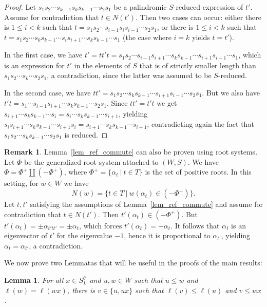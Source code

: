\documentclass[11pt]{article}
\newtheorem{lemma}[theo]{Lemma}
\theoremstyle{definition}
\newtheorem{rema}[theo]{Remark}
\numberwithin{equation}{section}
\begin{document}
\begin{proof}
	Let $s_1 s_2 \cdots s_{k-1} s_k s_{k-1}\cdots s_2 s_1$ be a palindromic $S$-reduced expression of $t'$. Assume for contradiction that $t\in N(t')$. Then two cases can occur: either there is $1\leq i < k$ such that $t=s_1 s_2 \cdots s_{i-1} s_i s_{i-1}\cdots s_2 s_1$, or there is $1 \leq i < k$ such that $t= s_1 s_2 \cdots s_k s_{k-1} \cdots s_i s_{i+1} \cdots s_k s_{k-1} \cdots s_1$ (the case where $i=k$ yields $t=t'$).
	
	In the first case, we have $t'=tt't= s_1 s_2 \cdots s_{i-1} s_{i+1} \cdots s_k s_{k-1} \cdots s_{i+1} s_{i-1} \cdots s_1$, which is an expression for $t'$ in the elements of $S$ that is of strictly smaller length than $s_1 s_2\cdots s_k \cdots s_2 s_1$, a contradiction, since the latter was assumed to be $S$-reduced. 
	
	In the second case, we have $tt'= s_1 s_2 \cdots s_k s_{k-1} \cdots s_{i+1} s_{i-1} \cdots s_2 s_1$. But we also have $t't= s_1 \cdots s_{i-1} s_{i+1}\cdots s_k s_{k-1} \cdots s_2 s_1$. Since $tt'=t't$ we get $s_{i+1} \cdots s_k s_{k-1} \cdots s_i = s_i \cdots s_k s_{k-1}\cdots s_{i+1}$, yielding $s_{i} s_{i+1} \cdots s_k s_{k-1} \cdots s_{i+1} s_i=s_{i+1} \cdots s_k s_{k-1} \cdots s_{i+1}$, contradicting again the fact that $s_1 s_2 \cdots s_k s_{k-1} \cdots s_2 s_1$ is reduced.  
\end{proof}
\begin{rema}
	Lemma~\ref{lem_ref_commute} can also be proven using root systems. Let $\Phi$ be the generalized root system attached to $(W,S)$. We have $\Phi=\Phi^+ \coprod (- \Phi^+)$, where $\Phi^+=\{\alpha_t~|~t\in T\}$ is the set of positive roots. In this setting, for $w\in W$ we have $$N(w)=\{t\in T~|~w(\alpha_t)\in(-\Phi^+)\}.$$ Let $t,t'$ satisfying the assumptions of Lemma~\ref{lem_ref_commute} and assume for contradiction that $t\in N(t')$. Then $t'(\alpha_t)\in(-\Phi^+)$. But $t'(\alpha_t)=\pm \alpha_{t'tt'}=\pm \alpha_{t}$, which forces $t'(\alpha_t)=-\alpha_t$. It follows that $\alpha_t$ is an eigenvector of $t'$ for the eigenvalue $-1$, hence it is proportional to $\alpha_{t'}$, yielding $\alpha_t=\alpha_{t'}$, a contradiction. 
\end{rema}

We now prove two Lemmatas that will be useful in the proofs of the main results: 

\begin{lemma}\label{lem_corr}
For all $x\in S_L^\theta$ and $u, w\in W$ such that $u \leq w$ and $\ell(w)=\ell(wx)$, there is $v\in \{u, ux\}$ such that $\ell(v)\leq \ell(u)$ and $v \leq wx$. 
\end{lemma}
\end{document}
